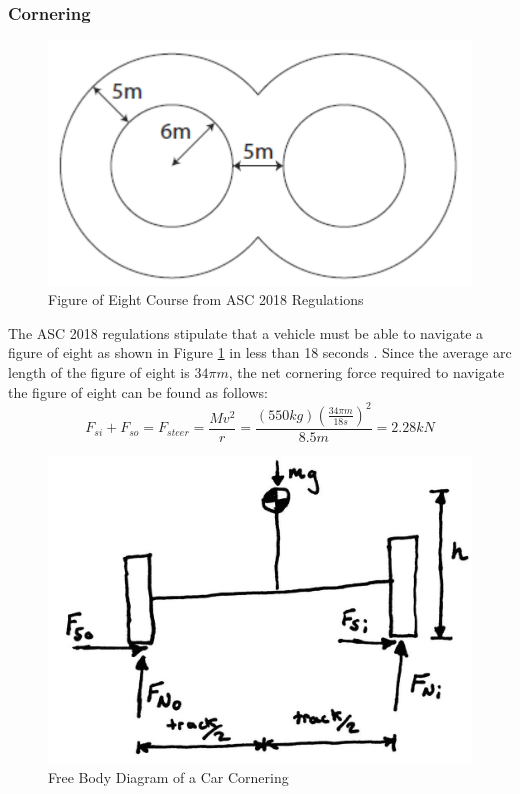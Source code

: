 \documentclass[12pt]{article}
\begin{document}
\subsubsection{Cornering}
\begin{figure}[h!]
	\centering
	\includegraphics[width=.5\textwidth]{./LaTex/dynamicScrutineering.PNG}
	\caption{Figure of Eight Course from ASC 2018 Regulations 
	\cite{ASC2018regs}}
	\label{fig:dynamicScrutineering}
\end{figure}
The ASC 2018 regulations stipulate that a vehicle must be able to navigate a figure of eight as shown in Figure \ref{fig:dynamicScrutineering} in less than 18 seconds \cite{ASC2018regs}. Since the average arc length of the figure of eight is $34\pi m$, the net cornering force required to navigate the figure of eight can be found as follows:
\begin{equation}
	F_{si} + F_{so} = F_{steer} = \frac{Mv^2}{r} = \frac{(550kg)\left(\frac{34\pi m}{18s}\right)^2}{8.5m} = 2.28kN
\end{equation}
\begin{figure}[h!]
	\centering
	\includegraphics[width=.5\textwidth]{./LaTex/steerFBD.jpg}
	\caption{Free Body Diagram of a Car Cornering}
	\label{fig:steerFBD}
\end{figure}
\end{document}
